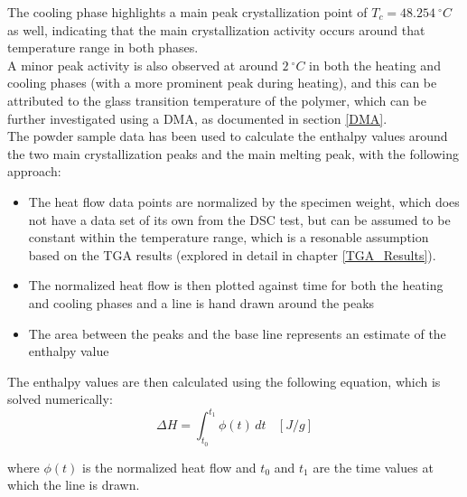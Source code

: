 \documentclass{article}
\begin{document}
        The cooling phase highlights a main peak crystallization point of $T_{c} =  48.254 \ ^{\circ}C$ as well, indicating 
        that the main crystallization activity occurs around that temperature range in both phases. \\ 

        A minor peak activity is also observed at around $2 \ ^{\circ}C$ in both the heating and cooling phases
        (with a more prominent peak during heating), and this can be attributed to the
        glass transition temperature of the polymer, which can be further investigated using a DMA, as documented in section \ref{DMA}. \\

        The powder sample data has been used to calculate the enthalpy values around the two main crystallization peaks and the main 
        melting peak, with the following approach: \\

        \begin{itemize}
            \item The heat flow data points are normalized by the specimen weight, which does not have a data set of its own from the DSC test, 
            but can be assumed to be constant within the temperature range, which is a resonable 
            assumption based on the TGA results (explored in detail in chapter \ref{TGA_Results}).
            \item The normalized heat flow is then plotted against time for both the heating and cooling phases and 
            a line is hand drawn around the peaks
            \item The area between the peaks and the base line represents an estimate of the enthalpy value  
        \end{itemize}

        The enthalpy values are then calculated using the following equation, which is solved numerically: \\ 

        \begin{equation}
            \Delta H = \int_{t_0}^{t_1} \phi (t) \,dt \ \ \ \ [J/g]
            \label{eq:enthalpy}
        \end{equation}

        where $\phi (t)$ is the normalized heat flow and $t_0$ and $t_1$ are the time values at which the line is drawn. 

        \clearpage
\end{document}
